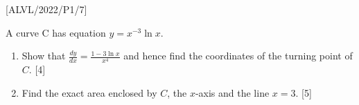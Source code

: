 \item {[}ALVL/2022/P1/7{]}

A curve C has equation $y=x^{-3}\ln x$.
\begin{enumerate}
\item Show that $\frac{dy}{dx}=\frac{1-3\ln x}{x^{4}}$ and hence find the
coordinates of the turning point of $C$. \hfill{}{[}4{]}
\item Find the exact area enclosed by $C$, the $x$-axis and the line $x=3$.
\hfill{}{[}5{]}
\end{enumerate}
